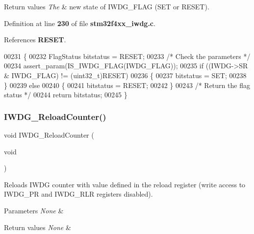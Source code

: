 \begin{DoxyRetVals}{Return values}
{\em The} & new state of I\+W\+D\+G\+\_\+\+F\+L\+AG (S\+ET or R\+E\+S\+ET). \\
\hline
\end{DoxyRetVals}


Definition at line \textbf{ 230} of file \textbf{ stm32f4xx\+\_\+iwdg.\+c}.



References \textbf{ R\+E\+S\+ET}.


\begin{DoxyCode}
00231 \{
00232   FlagStatus bitstatus = RESET;
00233   \textcolor{comment}{/* Check the parameters */}
00234   assert_param(IS_IWDG_FLAG(IWDG\_FLAG));
00235   \textcolor{keywordflow}{if} ((IWDG->SR & IWDG\_FLAG) != (uint32\_t)RESET)
00236   \{
00237     bitstatus = SET;
00238   \}
00239   \textcolor{keywordflow}{else}
00240   \{
00241     bitstatus = RESET;
00242   \}
00243   \textcolor{comment}{/* Return the flag status */}
00244   \textcolor{keywordflow}{return} bitstatus;
00245 \}
\end{DoxyCode}
\mbox{\label{group__IWDG_ga7147ebabdc3fef97f532b171a4e70d49}} 
\subsubsection{I\+W\+D\+G\+\_\+\+Reload\+Counter()}
{\footnotesize\ttfamily void I\+W\+D\+G\+\_\+\+Reload\+Counter (\begin{DoxyParamCaption}\item[{void}]{ }\end{DoxyParamCaption})}



Reloads I\+W\+DG counter with value defined in the reload register (write access to I\+W\+D\+G\+\_\+\+PR and I\+W\+D\+G\+\_\+\+R\+LR registers disabled). 


\begin{DoxyParams}{Parameters}
{\em None} & \\
\hline
\end{DoxyParams}

\begin{DoxyRetVals}{Return values}
{\em None} & \\
\hline
\end{DoxyRetVals}


